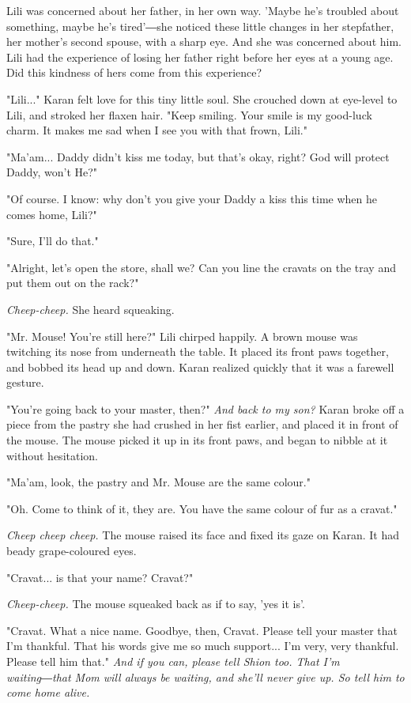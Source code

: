 Lili was concerned about her father, in her own way. 'Maybe he's
troubled about something, maybe he's tired'―she noticed these little
changes in her stepfather, her mother's second spouse, with a sharp eye.
And she was concerned about him. Lili had the experience of losing her
father right before her eyes at a young age. Did this kindness of hers
come from this experience?

"Lili..." Karan felt love for this tiny little soul. She crouched down
at eye-level to Lili, and stroked her flaxen hair. "Keep smiling. Your
smile is my good-luck charm. It makes me sad when I see you with that
frown, Lili."

"Ma'am... Daddy didn't kiss me today, but that's okay, right? God will
protect Daddy, won't He?"

"Of course. I know: why don't you give your Daddy a kiss this time when
he comes home, Lili?"

"Sure, I'll do that."

"Alright, let's open the store, shall we? Can you line the cravats on
the tray and put them out on the rack?"

\emph{Cheep-cheep.} She heard squeaking.

"Mr. Mouse! You're still here?" Lili chirped happily. A brown mouse was
twitching its nose from underneath the table. It placed its front paws
together, and bobbed its head up and down. Karan realized quickly that
it was a farewell gesture.

"You're going back to your master, then?" \emph{And back to my son?} Karan
broke off a piece from the pastry she had crushed in her fist earlier,
and placed it in front of the mouse. The mouse picked it up in its front
paws, and began to nibble at it without hesitation.

"Ma'am, look, the pastry and Mr. Mouse are the same colour."

"Oh. Come to think of it, they are. You have the same colour of fur as a
cravat."

\emph{Cheep cheep cheep.} The mouse raised its face and fixed its gaze on
Karan. It had beady grape-coloured eyes.

"Cravat... is that your name? Cravat?"

\emph{Cheep-cheep.} The mouse squeaked back as if to say, 'yes it is'.

"Cravat. What a nice name. Goodbye, then, Cravat. Please tell your
master that I'm thankful. That his words give me so much support... I'm
very, very thankful. Please tell him that." \emph{And if you can, please tell
	Shion too. That I'm waiting―that Mom will always be waiting, and she'll
	never give up. So tell him to come home alive.}

